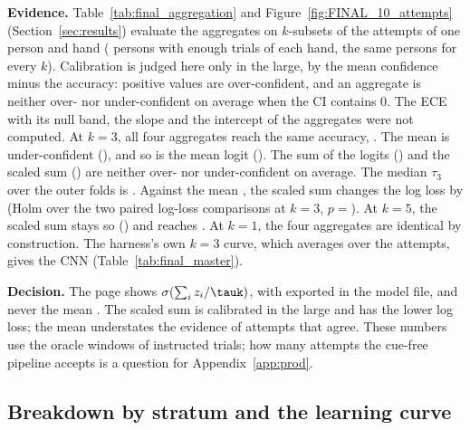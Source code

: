 \textbf{Evidence.}
Table~\ref{tab:final_aggregation} and Figure~\ref{fig:FINAL_10_attempts} (Section~\ref{sec:results}) evaluate the aggregates on $k$-subsets of the attempts of one person and hand ( persons with enough trials of each hand, the same persons for every $k$).
Calibration is judged here only in the large, by the mean confidence minus the accuracy: positive values are over-confident, and an aggregate is neither over- nor under-confident on average when the CI contains 0. The ECE with its null band, the slope and the intercept of the aggregates were not computed.
At $k = 3$, all four aggregates reach the same accuracy, .
The mean \pright{} is under-confident (), and so is the mean logit ().
The sum of the logits () and the scaled sum () are neither over- nor under-confident on average.
The median $\tau_3$ over the outer folds is .
Against the mean \pright{}, the scaled sum changes the log loss by  (Holm over the two paired log-loss comparisons at $k = 3$, $p = {}$).
At $k = 5$, the scaled sum stays so () and reaches .
At $k = 1$, the four aggregates are identical by construction.
The harness's own $k = 3$ curve, which averages \pright{} over the attempts, gives the CNN  (Table~\ref{tab:final_master}).

\textbf{Decision.}
The page shows $\sigma(\sum_i z_i/\tauk)$, with \tauk{} exported in the model file, and never the mean \pright{}.
The scaled sum is calibrated in the large and has the lower log loss; the mean \pright{} understates the evidence of attempts that agree.
These numbers use the oracle windows of instructed trials; how many attempts the cue-free pipeline accepts is a question for Appendix~\ref{app:prod}.


\subsection{Breakdown by stratum and the learning curve}\label{app:final:strata}

